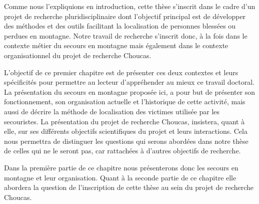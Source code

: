 Comme nous l'expliquions en introduction, cette thèse s'inscrit dans
le cadre d'un projet de recherche pluridisciplinaire dont l'objectif
principal est de développer des méthodes et des outils facilitant la
localisation de personnes blessées ou perdues en montagne. Notre
travail de recherche s'inscrit donc, à la fois dans le contexte métier
du secours en montagne mais également dans le contexte organisationnel
du projet de recherche Choucas.

L'objectif de ce premier chapitre est de présenter ces deux contextes
et leurs spécificités pour permettre au lecteur d'appréhender au mieux
ce travail doctoral. La présentation du secours en montagne proposée
ici, a pour but de présenter son fonctionnement, son organisation
actuelle et l'historique de cette activité, mais aussi de décrire la
méthode de localisation des victimes utilisée par les secouristes. La
présentation du projet de recherche Choucas, insistera, quant à elle,
sur ses différents objectifs scientifiques du projet et leurs
interactions. Cela nous permettra de distinguer les questions qui
serons abordées dans notre thèse de celles qui ne le seront pas, car
rattachées à d'autres objectifs de recherche.

Dans la première partie de ce chapitre nous présenterons donc les
secours en montagne et leur organisation. Quant à la seconde partie de
ce chapitre elle abordera la question de l'inscription de cette thèse
au sein du projet de recherche Choucas.

